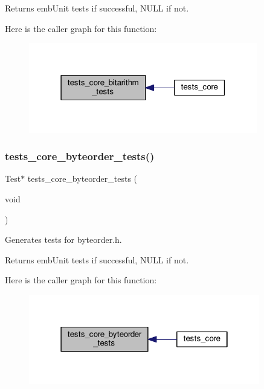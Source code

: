 \begin{DoxyReturn}{Returns}
emb\+Unit tests if successful, N\+U\+LL if not. 
\end{DoxyReturn}
Here is the caller graph for this function\+:
\nopagebreak
\begin{figure}[H]
\begin{center}
\leavevmode
\includegraphics[width=283pt]{group__unittests_ga0e92d30389bd2bf5e8482efa37e34733_icgraph}
\end{center}
\end{figure}
\mbox{\label{group__unittests_ga664f87f90c88e1bb9d124238e01076d1}} 
\subsubsection{\texorpdfstring{tests\+\_\+core\+\_\+byteorder\+\_\+tests()}{tests\_core\_byteorder\_tests()}}
{\footnotesize\ttfamily Test$\ast$ tests\+\_\+core\+\_\+byteorder\+\_\+tests (\begin{DoxyParamCaption}\item[{void}]{ }\end{DoxyParamCaption})}



Generates tests for byteorder.\+h. 

\begin{DoxyReturn}{Returns}
emb\+Unit tests if successful, N\+U\+LL if not. 
\end{DoxyReturn}
Here is the caller graph for this function\+:
\nopagebreak
\begin{figure}[H]
\begin{center}
\leavevmode
\includegraphics[width=286pt]{group__unittests_ga664f87f90c88e1bb9d124238e01076d1_icgraph}
\end{center}
\end{figure}
\mbox{\label{group__unittests_gaf6c587a2b7c4b7284754cb254d828ae4}} 
